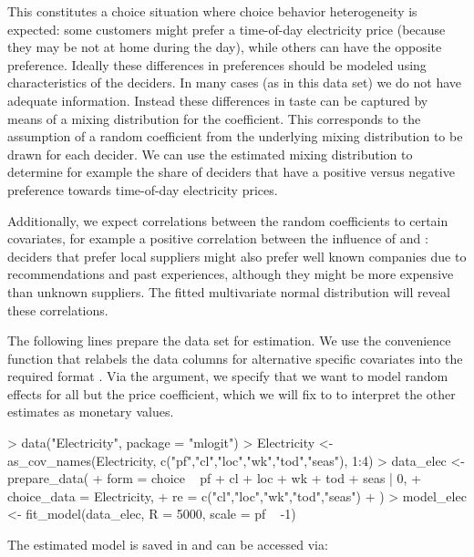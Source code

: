 \documentclass[article]{jss}
\newcommand{\fct}[1]{\code{#1()}}
\begin{document}
This constitutes a choice situation where choice behavior heterogeneity is expected: some customers might prefer a time-of-day electricity price (because they may be not at home during the day), while others can have the opposite preference. Ideally these differences in preferences should be modeled using characteristics of the deciders. In many cases (as in this data set) we do not have adequate information. Instead these differences in taste can be captured by means of a mixing distribution for the  coefficient. This corresponds to the assumption of a random coefficient from the underlying mixing distribution to be drawn for each decider. We can use the estimated mixing distribution to determine for example the share of deciders that have a positive versus negative preference towards time-of-day electricity prices.

Additionally, we expect correlations between the random coefficients to certain covariates, for example a positive correlation between the influence of  and : deciders that prefer local suppliers might also prefer well known companies due to recommendations and past experiences, although they might be more expensive than unknown suppliers. The fitted multivariate normal distribution will reveal these correlations.

The following lines prepare the  data set for estimation. We use the convenience function \fct{as\_cov\_names} that relabels the data columns for alternative specific covariates into the required format . Via the  argument, we specify that we want to model random effects for all but the price coefficient, which we will fix to  to interpret the other estimates as monetary values.

\begin{Schunk}
\begin{Sinput}
> data("Electricity", package = "mlogit")
> Electricity <- as_cov_names(Electricity, c("pf","cl","loc","wk","tod","seas"), 1:4)
> data_elec <- prepare_data(
+    form = choice ~ pf + cl + loc + wk + tod + seas | 0,
+    choice_data = Electricity,
+    re = c("cl","loc","wk","tod","seas")
+    )
> model_elec <- fit_model(data_elec, R = 5000, scale = pf ~ -1)
\end{Sinput}
\end{Schunk}

The estimated model is saved in  and can be accessed via:
\end{document}
